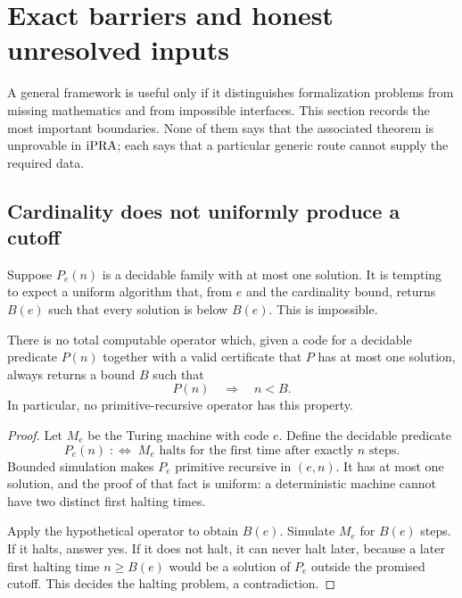 \section{Exact barriers and honest unresolved inputs}
\label{sec:barriers}

A general framework is useful only if it distinguishes formalization problems from
missing mathematics and from impossible interfaces.  This section records the most
important boundaries.  None of them says that the associated theorem is unprovable in
\(\mathrm{iPRA}\); each says that a particular generic route cannot supply the required data.

\subsection{Cardinality does not uniformly produce a cutoff}

Suppose \(P_e(n)\) is a decidable family with at most one solution.  It is tempting to
expect a uniform algorithm that, from \(e\) and the cardinality bound, returns \(B(e)\)
such that every solution is below \(B(e)\).  This is impossible.

\begin{barrier}
\label{barrier:cardinality-cutoff}
There is no total computable operator which, given a code for a decidable predicate
\(P(n)\) together with a valid certificate that \(P\) has at most one solution, always
returns a bound \(B\) such that
\[
  P(n)\quad\Longrightarrow\quad n<B.
\]
In particular, no primitive-recursive operator has this property.
\end{barrier}

\begin{proof}
Let \(M_e\) be the Turing machine with code \(e\).  Define the decidable predicate
\[
  P_e(n)\;:\Longleftrightarrow\;
  M_e\text{ halts for the first time after exactly }n\text{ steps}.
\]
Bounded simulation makes \(P_e\) primitive recursive in \((e,n)\).  It has at most one
solution, and the proof of that fact is uniform: a deterministic machine cannot have
two distinct first halting times.

Apply the hypothetical operator to obtain \(B(e)\).  Simulate \(M_e\) for \(B(e)\)
steps.  If it halts, answer yes.  If it does not halt, it can never halt later, because
a later first halting time \(n\ge B(e)\) would be a solution of \(P_e\) outside the
promised cutoff.  This decides the halting problem, a contradiction.
\end{proof}


